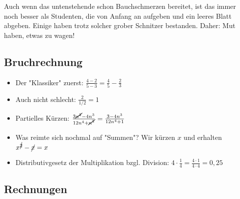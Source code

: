 Auch wenn das untenstehende schon Bauchschmerzen bereitet, ist das immer noch besser als Studenten, die von Anfang an aufgeben und ein leeres Blatt abgeben. Einige haben trotz solcher grober Schnitzer bestanden. Daher: Mut haben, etwas zu wagen!

\subsection* {Bruchrechnung}

\begin{itemize}	
	\item Der "Klassiker" zuerst: $\frac{4-2}{5-3} = \frac{4}{5} - \frac{2}{3}$
	\item Auch nicht schlecht: $\frac{2}{1/2} = 1$
	\item Partielles Kürzen: $\frac{3\cancel{n^2}-4n^3}{12n^4+\cancel{n^2}} = \frac{3 - 4n^3}{12n^4+1}$
	\item Was reimte sich nochmal auf "Summen"? Wir kürzen $x$ und erhalten $x^{\cancel{2}}-\cancel{x} = x$
	\item Distributivgesetz der Multiplikation bzgl. Division: $4\cdot\frac{1}{4} = \frac{4\cdot 1}{4\cdot 4} = 0{,}25$
\end{itemize}
	
\subsection* {Rechnungen}
	
